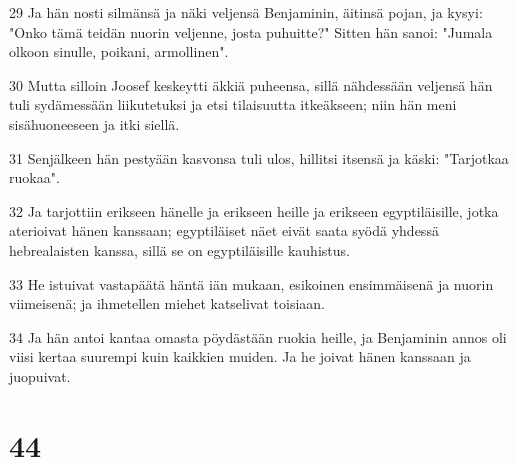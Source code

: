 \par 29 Ja hän nosti silmänsä ja näki veljensä Benjaminin, äitinsä pojan, ja kysyi: "Onko tämä teidän nuorin veljenne, josta puhuitte?" Sitten hän sanoi: "Jumala olkoon sinulle, poikani, armollinen".
\par 30 Mutta silloin Joosef keskeytti äkkiä puheensa, sillä nähdessään veljensä hän tuli sydämessään liikutetuksi ja etsi tilaisuutta itkeäkseen; niin hän meni sisähuoneeseen ja itki siellä.
\par 31 Senjälkeen hän pestyään kasvonsa tuli ulos, hillitsi itsensä ja käski: "Tarjotkaa ruokaa".
\par 32 Ja tarjottiin erikseen hänelle ja erikseen heille ja erikseen egyptiläisille, jotka aterioivat hänen kanssaan; egyptiläiset näet eivät saata syödä yhdessä hebrealaisten kanssa, sillä se on egyptiläisille kauhistus.
\par 33 He istuivat vastapäätä häntä iän mukaan, esikoinen ensimmäisenä ja nuorin viimeisenä; ja ihmetellen miehet katselivat toisiaan.
\par 34 Ja hän antoi kantaa omasta pöydästään ruokia heille, ja Benjaminin annos oli viisi kertaa suurempi kuin kaikkien muiden. Ja he joivat hänen kanssaan ja juopuivat.

\chapter{44}

